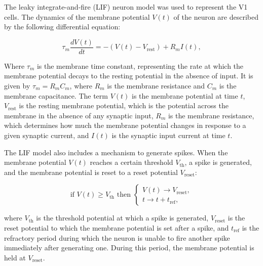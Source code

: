 \documentclass[12pt]{article}
\begin{document}
The leaky integrate-and-fire (LIF) neuron model was used to represent the V1 cells. The dynamics of the membrane potential \(V(t)\) of the neuron are described by the following differential equation:

\begin{equation}
\tau_m \frac{dV(t)}{dt} = - (V(t) - V_{\text{rest}}) + R_m I(t),
\label{eq:LIF}
\end{equation}

Where \(\tau_m\) is the membrane time constant, representing the rate at which the membrane potential decays to the resting potential in the absence of input. It is given by \(\tau_m = R_m C_m\), where \(R_m\) is the membrane resistance and \(C_m\) is the membrane capacitance. The term \(V(t)\) is the membrane potential at time \(t\), \(V_{\text{rest}}\) is the resting membrane potential, which is the potential across the membrane in the absence of any synaptic input, \(R_m\) is the membrane resistance, which determines how much the membrane potential changes in response to a given synaptic current, and \(I(t)\) is the synaptic input current at time \(t\).

The LIF model also includes a mechanism to generate spikes. When the membrane potential \(V(t)\) reaches a certain threshold \(V_{\text{th}}\), a spike is generated, and the membrane potential is reset to a reset potential \(V_{\text{reset}}\):

\begin{equation}
\text{if } V(t) \geq V_{\text{th}} \text{ then } \begin{cases}
V(t) \rightarrow V_{\text{reset}}, \\
t \rightarrow t + t_{\text{ref}},
\end{cases}
\end{equation}

where \(V_{\text{th}}\) is the threshold potential at which a spike is generated, \(V_{\text{reset}}\) is the reset potential to which the membrane potential is set after a spike, and \(t_{\text{ref}}\) is the refractory period during which the neuron is unable to fire another spike immediately after generating one. During this period, the membrane potential is held at \(V_{\text{reset}}\).
\end{document}
